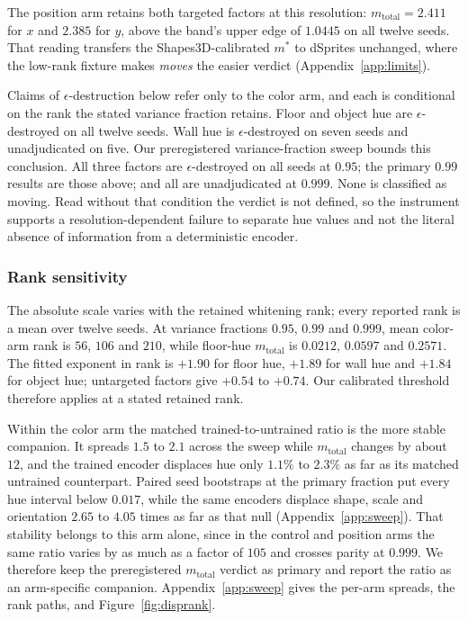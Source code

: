 \documentclass[10pt]{article}
\begin{document}
The position arm retains both targeted factors at this resolution: $m_{\mathrm{total}}=2.411$ for
$x$ and $2.385$ for $y$, above the band's upper edge of $1.0445$ on all twelve seeds. That reading
transfers the Shapes3D-calibrated $m^{*}$ to dSprites unchanged, where the low-rank fixture makes
\emph{moves} the easier verdict (Appendix~\ref{app:limits}).

Claims of $\epsilon$-destruction below refer only to the color arm, and each is conditional on the
rank the stated variance fraction retains. Floor and object hue are
$\epsilon$-destroyed on all twelve seeds. Wall hue is
$\epsilon$-destroyed on seven seeds and unadjudicated on five. Our preregistered variance-fraction
sweep bounds this conclusion. All three factors are $\epsilon$-destroyed on all seeds at $0.95$;
the primary $0.99$ results are those above; and all are unadjudicated at $0.999$. None is
classified as moving. Read without that condition the verdict is not defined, so the instrument
supports a resolution-dependent failure to separate hue values and not the literal absence of
information from a deterministic encoder.

\subsubsection*{Rank sensitivity}
The absolute scale varies with the retained whitening rank; every reported rank is a mean over
twelve seeds. At variance fractions $0.95$, $0.99$ and $0.999$, mean color-arm rank is $56$, $106$
and $210$, while floor-hue $m_{\mathrm{total}}$ is $0.0212$, $0.0597$ and $0.2571$. The fitted
exponent in rank is $+1.90$ for floor hue, $+1.89$ for wall hue and $+1.84$ for object hue;
untargeted factors give $+0.54$ to $+0.74$. Our calibrated threshold therefore applies at a stated
retained rank.

Within the color arm the matched trained-to-untrained ratio is the more stable companion. It
spreads $1.5$ to $2.1$ across the sweep while $m_{\mathrm{total}}$ changes by about $12$, and the
trained encoder displaces hue only $1.1\%$ to $2.3\%$ as far as its matched untrained counterpart.
Paired seed bootstraps at the primary fraction put every hue interval below $0.017$, while the same
encoders displace shape, scale and orientation $2.65$ to $4.05$ times as far as that null
(Appendix~\ref{app:sweep}).
That stability belongs to this arm alone, since in the control and position arms the same ratio
varies by as much as a factor of $105$ and crosses parity at $0.999$. We therefore keep the preregistered
$m_{\mathrm{total}}$ verdict as primary and report the ratio as an arm-specific companion.
Appendix~\ref{app:sweep} gives the per-arm spreads, the rank paths, and Figure~\ref{fig:disprank}.
\end{document}

